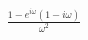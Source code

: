\documentclass[preview]{standalone}
\begin{document}
\begin{align*}
\frac{1-e^{i\omega}(1-i\omega)}{\omega^{2}}
\end{align*}
\end{document}
